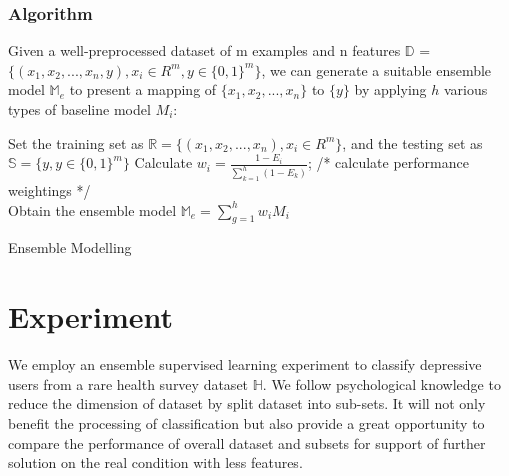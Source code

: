 \documentclass[10pt,journal,compsoc]{IEEEtran}
\begin{document}
\subsubsection{Algorithm}
Given a well-preprocessed dataset of m examples and n features $\mathbb{D}$ = $\displaystyle \big\{ (x_{1}, x_{2}, ... , x_{n}, y ), x_{i} \in R^{m}, y \in {\{0, 1\}}^{m}  \big\}$, we can generate a suitable ensemble model $\mathbb{M}_{e} $ to present a mapping of $\big\{ x_{1}, x_{2}, ... , x_{n} \big\}$ to $\big\{ y \big\}$ by applying $h$ various types of baseline model $M_{i}$:\\
\IncMargin{2em}
\begin{algorithm}[h]
\BlankLine
Set the training set as $\mathbb{R} = \big\{ (x_{1}, x_{2}, ... , x_{n} ), x_{i} \in R^{m} \big\}$, and the testing set as $\mathbb{S} = \big\{  y, y \in {\{0, 1\}}^{m}  \big\}$\;
Calculate $w_{i} = \frac{1 - E_{i} }{\sum_{k = 1}^{h} (1 - E_{k}) }$; /* calculate performance weightings */\\
Obtain the ensemble model $\mathbb{M}_{e} = \sum_{g = 1}^{h} w_{i} M_{i} $\;
\caption{Ensemble Modelling}\label{ensemble}
\end{algorithm}\DecMargin{2em}

%
%
%
%
%
%
\section{Experiment}
We employ an ensemble supervised learning experiment to classify depressive users from a rare health survey dataset $\mathbb{H}$. We follow psychological knowledge to reduce the dimension of dataset by split dataset into sub-sets. It will not only benefit the processing of classification but also provide a great opportunity to compare the performance of overall dataset and subsets for support of further solution on the real condition with less features.
\end{document}
